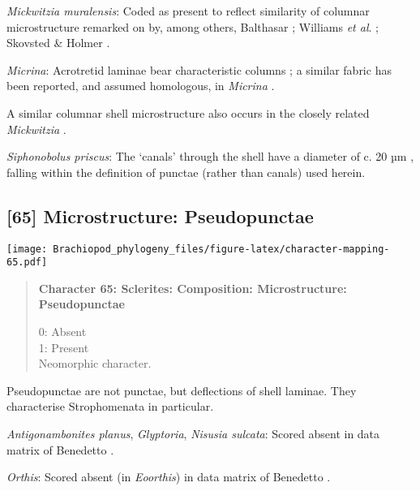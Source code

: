 \documentclass[openany]{book}
\theoremstyle{definition}
\theoremstyle{definition}
\theoremstyle{definition}
\theoremstyle{remark}
\begin{document}
\hypertarget{Mickwitzia_muralensis-coding-64}{}
\emph{Mickwitzia muralensis}: Coded as present to reflect similarity of
columnar microstructure remarked on by, among others, Balthasar
\citeyearpar{Balthasar2008iMummpikia}; Williams \emph{et al}.
\citeyearpar{Williams2007Supplement}; Skovsted \& Holmer
\citeyearpar{Skovsted2003EarlyCambrian}.

\hypertarget{Micrina-coding-64}{}
\emph{Micrina}: Acrotretid laminae bear characteristic columns
\citep[e.g.][]{Zhang2016Epithelialcell}; a similar fabric has been
reported, and assumed homologous, in \emph{Micrina}
\citep{Butler2012ConstructingCambrian}.

A similar columnar shell microstructure also occurs in the closely
related \emph{Mickwitzia} \citep{Balthasar2008iMummpikia}.

\hypertarget{Siphonobolus_priscus-coding-64}{}
\emph{Siphonobolus priscus}: The `canals' through the shell have a
diameter of c. 20 µm \citep[text-fig. 2a]{Williams2004Chemicostructure},
falling within the definition of punctae (rather than canals) used
herein.

\subsection*{{[}65{]} Microstructure:
Pseudopunctae}\label{microstructure-pseudopunctae}

\texttt{[image: Brachiopod\_phylogeny\_files/figure-latex/character-mapping-65.pdf]}

\begin{quote}
\textbf{Character 65: Sclerites: Composition: Microstructure:
Pseudopunctae}

0: Absent\\
1: Present\\
Neomorphic character.
\end{quote}

Pseudopunctae are not punctae, but deflections of shell laminae. They
characterise Strophomenata in particular.

\hypertarget{Antigonambonites_planus-coding-65}{}
\emph{Antigonambonites planus}, \emph{Glyptoria}, \emph{Nisusia
sulcata}: Scored absent in data matrix of Benedetto
\citeyearpar{Benedetto2009iChaniella}.

\hypertarget{Orthis-coding-65}{}
\emph{Orthis}: Scored absent (in \emph{Eoorthis}) in data matrix of
Benedetto \citeyearpar{Benedetto2009iChaniella}.
\end{document}
